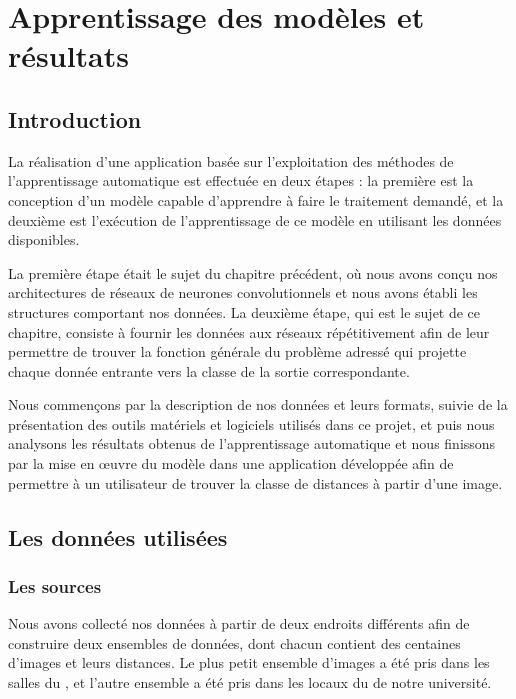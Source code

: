 \chapter{Apprentissage des modèles et résultats}

\section{Introduction}

La réalisation d'une application basée sur l'exploitation des méthodes de
l'apprentissage automatique est effectuée en deux étapes : la première est
la conception d'un modèle capable d'apprendre à faire le traitement demandé, et
la deuxième est l'exécution de l'apprentissage de ce modèle en utilisant
les données disponibles.

La première étape était le sujet du chapitre précédent, où nous avons conçu nos
architectures de réseaux de neurones convolutionnels et nous avons établi les
structures comportant nos données. La deuxième étape, qui est le sujet de ce chapitre,
consiste à fournir les données aux réseaux répétitivement afin de leur permettre
de trouver la fonction générale du problème adressé qui projette chaque donnée
entrante vers la classe de la sortie correspondante.

Nous commençons par la description de nos données et leurs formats, suivie de
la présentation des outils matériels et logiciels utilisés dans ce projet, et puis
nous analysons les résultats obtenus de l'apprentissage automatique et nous
finissons par la mise en œuvre du modèle dans une application développée
afin de permettre à un utilisateur de trouver la classe de distances à partir d'une
image.

\section{Les données utilisées}

\subsection{Les sources}

Nous avons collecté nos données à partir de deux endroits différents afin de
construire deux ensembles de données, dont chacun contient des centaines d'images
et leurs distances. Le plus petit ensemble d'images a été
pris dans les salles du ,
et l'autre ensemble a été pris dans les locaux du  de
notre université.

